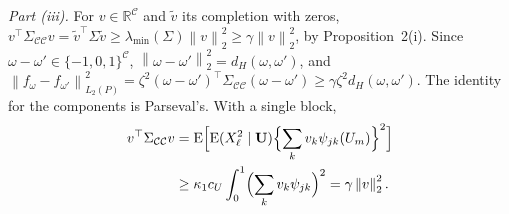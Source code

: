\documentclass[10pt]{book}
\theoremstyle{definition}
\newcommand{\R}{\mathbb{R}}
\newcommand{\E}{\mathrm{E}}
\newcommand{\T}{^{\top}}
\newcommand{\norm}[1]{\left\lVert #1 \right\rVert}
\newcommand{\cv}{\ell}
\newcommand{\md}{m}
\newcommand{\lev}{j}
\newcommand{\tsl}{k}
\newcommand{\bU}{\mathbf{U}}
\newcommand{\wav}[2]{\psi_{#1#2}}
\newcommand{\Gram}{\Sigma}
\newcommand{\lmin}{\lambda_{\min}}
\begin{document}
{\emph{Part (iii).} For $v \in \R^{\mathcal{C}}$ and $\tilde v$ its completion
with zeros, $v\T\Gram_{\mathcal{C}\mathcal{C}}v = \tilde v\T\Gram\tilde v \ge
\lmin(\Gram)\norm{v}_{2}^{2} \ge \gamma\norm{v}_{2}^{2}$, by
Proposition~2(i). Since $\omega-\omega' \in \{-1,0,1\}^{\mathcal{C}}$,
$\norm{\omega-\omega'}_{2}^{2} = d_{H}(\omega,\omega')$, and
$\norm{f_{\omega}-f_{\omega'}}_{L_2(P)}^{2} =
\zeta^{2}(\omega-\omega')\T\Gram_{\mathcal{C}\mathcal{C}}(\omega-\omega') \ge
\gamma\zeta^{2}d_{H}(\omega,\omega')$. The identity for the components is
Parseval's. With a single block,
\begin{align*}
  v\T\Gram_{\mathcal{C}\mathcal{C}}v &=
  \E\Bigl[\E(X_{\cv}^{2}\mid\bU)\Bigl\{\sum_{\tsl}v_{\tsl}\wav{\lev}{\tsl}(U_{\md})\Bigr\}^{2}\Bigr]
  \\
  &\ge \kappa_1c_U\int_0^1\Bigl(\sum_{\tsl}v_{\tsl}\wav{\lev}{\tsl}\Bigr)^{2} =
  \gamma\norm{v}_{2}^{2} .
\end{align*}

}
\end{document}
